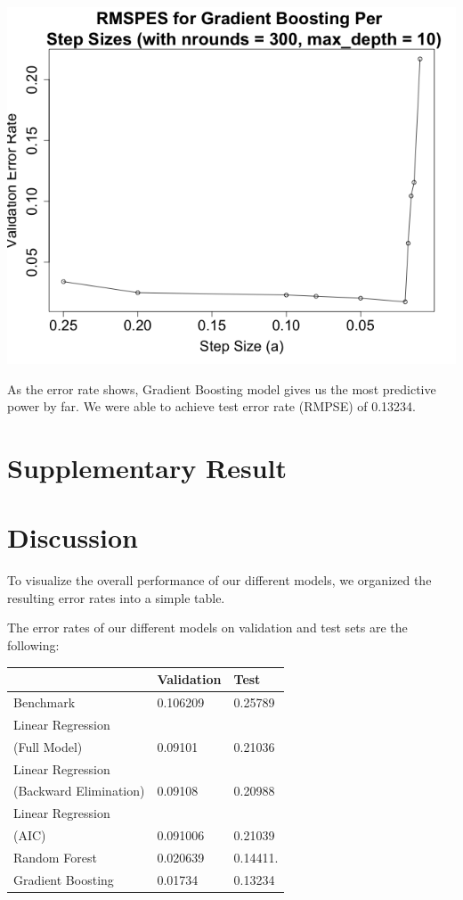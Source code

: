 \documentclass[letterpaper,twocolumn,11pt]{article}
\begin{document}
\includegraphics[scale=0.33]{img/gb_rmpse.png}

As the error rate shows, Gradient Boosting model gives us the most predictive power by far. We were able to achieve test error rate (RMPSE) of 0.13234.


\section{Supplementary Result}

\section{Discussion}
To visualize the overall performance of our different models, we organized the resulting error rates into a simple table. 

The error rates of our different models on validation and test sets are the following:
\begin{center}
    \begin{tabular}{| l | l | l |}
      \hline
       & Validation & Test \\ \hline
      Benchmark & 0.106209 & 0.25789  \\ \hline
      Linear Regression \\
      (Full Model) & 0.09101 & 0.21036 \\ \hline
      Linear Regression \\
      (Backward Elimination) & 0.09108 & 0.20988 \\ \hline
      Linear Regression \\
      (AIC) & 0.091006 & 0.21039 \\ \hline
      Random Forest & 0.020639 & 0.14411.  \\ \hline
      Gradient Boosting & 0.01734 & 0.13234  \\ \hline
      \hline    
    \end{tabular}
\end{center}
\end{document}

